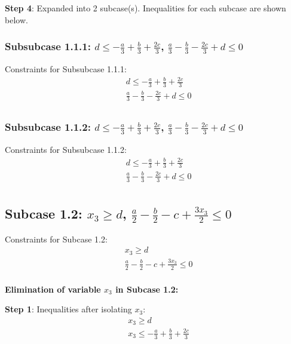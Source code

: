 \documentclass{article}
\begin{document}
\textbf{Step 4}: Expanded into 2 subcase(s). Inequalities for each subcase are shown below.

\subsubsection{Subsubcase 1.1.1: $d \leq - \frac{a}{3} + \frac{b}{3} + \frac{2 c}{3}$, $\frac{a}{3} - \frac{b}{3} - \frac{2 c}{3} + d \leq 0$}

Constraints for Subsubcase 1.1.1:
\begin{align}
& d \leq - \frac{a}{3} + \frac{b}{3} + \frac{2 c}{3} \\
& \frac{a}{3} - \frac{b}{3} - \frac{2 c}{3} + d \leq 0 \\
\end{align}

\subsubsection{Subsubcase 1.1.2: $d \leq - \frac{a}{3} + \frac{b}{3} + \frac{2 c}{3}$, $\frac{a}{3} - \frac{b}{3} - \frac{2 c}{3} + d \leq 0$}

Constraints for Subsubcase 1.1.2:
\begin{align}
& d \leq - \frac{a}{3} + \frac{b}{3} + \frac{2 c}{3} \\
& \frac{a}{3} - \frac{b}{3} - \frac{2 c}{3} + d \leq 0 \\
\end{align}

\subsection{Subcase 1.2: $x_{3} \geq d$, $\frac{a}{2} - \frac{b}{2} - c + \frac{3 x_{3}}{2} \leq 0$}

Constraints for Subcase 1.2:
\begin{align}
& x_{3} \geq d \\
& \frac{a}{2} - \frac{b}{2} - c + \frac{3 x_{3}}{2} \leq 0 \\
\end{align}

\textbf{Elimination of variable $x_{3}$ in Subcase 1.2:}

\textbf{Step 1}: Inequalities after isolating $x_{3}$:
\begin{align}
& x_{3} \geq d \\
& x_{3} \leq - \frac{a}{3} + \frac{b}{3} + \frac{2 c}{3} \\
\end{align}
\end{document}
